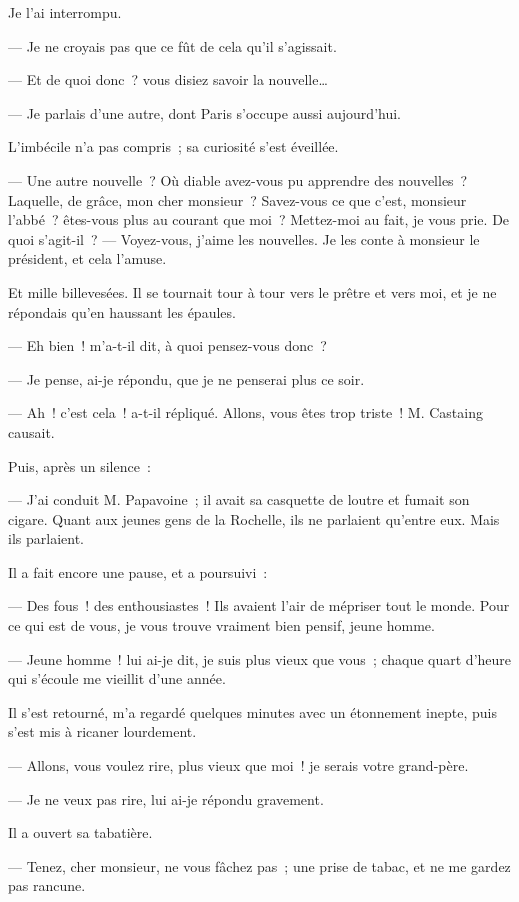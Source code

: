 \documentclass[french,twoside]{book} %
\begin{document}
Je l’ai interrompu.\par
— Je ne croyais pas que ce fût de cela qu’il s’agissait.\par
— Et de quoi donc ? vous disiez savoir la nouvelle…\par
— Je parlais d’une autre, dont Paris s’occupe aussi aujourd’hui.\par
L’imbécile n’a pas compris ; sa curiosité s’est éveillée.\par
— Une autre nouvelle ? Où diable avez-vous pu apprendre des nouvelles ? Laquelle, de grâce, mon cher monsieur ? Savez-vous ce que c’est, monsieur l’abbé ? êtes-vous plus au courant que moi ? Mettez-moi au fait, je vous prie. De quoi s’agit-il ? — Voyez-vous, j’aime les nouvelles. Je les conte à monsieur le président, et cela l’amuse.\par
Et mille billevesées. Il se tournait tour à tour vers le prêtre et vers moi, et je ne répondais qu’en haussant les épaules.\par
— Eh bien ! m’a-t-il dit, à quoi pensez-vous donc ?\par
— Je pense, ai-je répondu, que je ne penserai plus ce soir.\par
 — Ah ! c’est cela ! a-t-il répliqué. Allons, vous êtes trop triste ! M. Castaing causait.\par
Puis, après un silence :\par
— J’ai conduit M. Papavoine ; il avait sa casquette de loutre et fumait son cigare. Quant aux jeunes gens de la Rochelle, ils ne parlaient qu’entre eux. Mais ils parlaient.\par
Il a fait encore une pause, et a poursuivi :\par
— Des fous ! des enthousiastes ! Ils avaient l’air de mépriser tout le monde. Pour ce qui est de vous, je vous trouve vraiment bien pensif, jeune homme.\par
— Jeune homme ! lui ai-je dit, je suis plus vieux que vous ; chaque quart d’heure qui s’écoule me vieillit d’une année.\par
Il s’est retourné, m’a regardé quelques minutes avec un étonnement inepte, puis s’est mis à ricaner lourdement.\par
— Allons, vous voulez rire, plus vieux que moi ! je serais votre grand-père.\par
— Je ne veux pas rire, lui ai-je répondu gravement.\par
Il a ouvert sa tabatière.\par
— Tenez, cher monsieur, ne vous fâchez pas ; une prise de tabac, et ne me gardez pas rancune.\par
\end{document}
